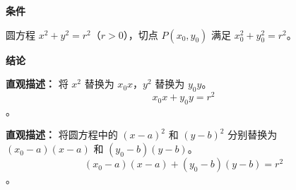 \begin{statementbox}
	\textbf{\textcolor{CStatement}{条件}}
	\begin{description}[style=nextline, leftmargin=2.8em, labelsep=0.5em, itemsep=0.35em]
		\item[\textbf{\textcolor{CStatement}{条件1（圆心在原点）：}}]
			圆方程 $x^2+y^2=r^2$（$r>0$），切点 $P(x_0,y_0)$ 满足 $x_0^2+y_0^2=r^2$。
	\end{description}
	\textbf{\textcolor{CStatement}{结论}}
	\begin{description}[style=nextline, leftmargin=2.8em, labelsep=0.5em, itemsep=0.45em]
		\item[\textbf{\textcolor{CStatement}{结论一（切线方程）：}}]
			\textbf{\textcolor{CStatement}{直观描述：}}
			将 $x^2$ 替换为 $x_0 x$，$y^2$ 替换为 $y_0 y$。
			\[
				x_0 x + y_0 y = r^2
			\]
			。
		\item[\textbf{\textcolor{CStatement}{推广结论（平移推广）：}}]
			\textbf{\textcolor{CStatement}{直观描述：}}
			将圆方程中的 $(x-a)^2$ 和 $(y-b)^2$ 分别替换为 $(x_0-a)(x-a)$ 和 $(y_0-b)(y-b)$。
			\[
				(x_0-a)(x-a)+(y_0-b)(y-b)=r^2
			\]
			。
	\end{description}

\end{statementbox}
